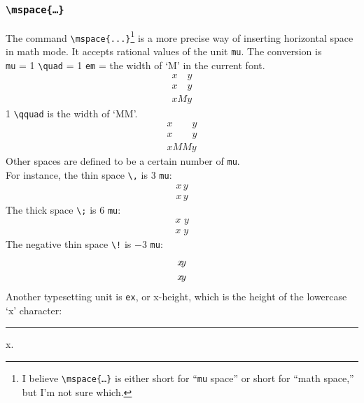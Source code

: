 \documentclass[12pt]{article}
\begin{document}
    \subsubsection{\texttt{\textbackslash mspace\{\dots\}}}
    The command \verb$\mspace{...}$\footnote{
        I believe \texttt{\textbackslash mspace\{\dots\}} is either short for ``\texttt{mu} space'' or short for ``math space,'' but I'm not sure which. 
    }
    is a more precise way of inserting horizontal space in math mode. It accepts rational values of the unit \texttt{mu}. The conversion is \\
    
     \texttt{mu} = 1 \verb$\quad$ = 1 \texttt{em} = the width of `M' in the current font. 
    \begin{gather*}
        x \mspace{18mu} y \\
        x \quad y \\
        xMy
    \end{gather*}
    1 \verb$\qquad$ is the width of `MM'.
    \begin{gather*}
        x \mspace{36mu} y \\
        x \qquad y \\
        xMMy
    \end{gather*}
    Other spaces are defined to be a certain number of \texttt{mu}. \\
    For instance, the thin space \verb$\,$ is 3 \texttt{mu}: 
    \begin{gather*}
        x \mspace{3mu} y \\
        x\,y
    \end{gather*}
    The thick space \verb$\;$ is 6 \texttt{mu}: \\
    \begin{gather*}
        x \mspace{6mu} y \\
        x\;y
    \end{gather*}
    The negative thin space \verb$\!$ is $-3$ \texttt{mu}:
    \begin{gather*}
        x \mspace{-3mu} y \\
        x\!y
    \end{gather*}
    Another typesetting unit is \texttt{ex}, or x-height, which is the height of the lowercase `x' character: \rule{1pt}{1ex}x. 
\end{document}
